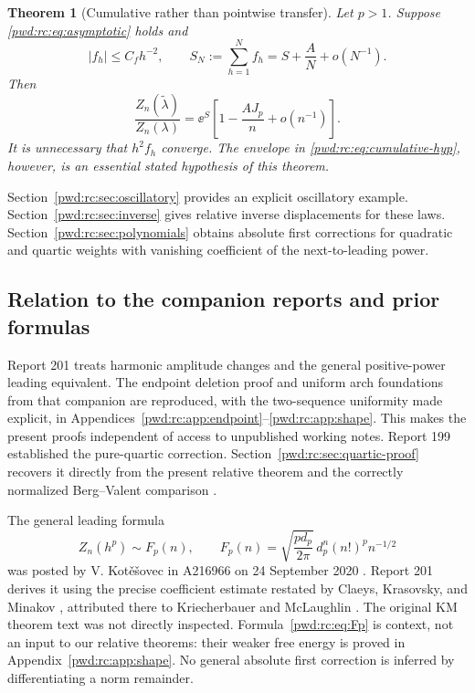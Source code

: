 \documentclass[11pt,letterpaper]{article}
\numberwithin{equation}{section}
\newtheorem{theorem}{Theorem}[section]
\theoremstyle{remark}\newtheorem{remark}[theorem]{Remark}
\begin{document}
\begin{theorem}[Cumulative rather than pointwise transfer]\label{pwd:rc:thm:cumulative}
Let $p>1$. Suppose \eqref{pwd:rc:eq:asymptotic} holds and
\begin{equation}\label{pwd:rc:eq:cumulative-hyp}
 |f_h|\le C_fh^{-2},\qquad
 S_N:=\sum_{h=1}^Nf_h=S+\frac A N+o(N^{-1}).
\end{equation}
Then
\begin{equation}\label{pwd:rc:eq:cumulative}
 \frac{Z_n(\widetilde\lambda)}{Z_n(\lambda)}
 =\ee^S\left[1-\frac{A J_p}{n}+o(n^{-1})\right].
\end{equation}
It is unnecessary that $h^2f_h$ converge. The envelope in \eqref{pwd:rc:eq:cumulative-hyp}, however, is an essential stated hypothesis of this theorem.
\end{theorem}
Section~\ref{pwd:rc:sec:oscillatory} provides an explicit oscillatory example. Section~\ref{pwd:rc:sec:inverse} gives relative inverse displacements for these laws. Section~\ref{pwd:rc:sec:polynomials} obtains absolute first corrections for quadratic and quartic weights with vanishing coefficient of the next-to-leading power.

\subsection{Relation to the companion reports and prior formulas}
Report 201 treats harmonic amplitude changes and the general positive-power leading equivalent. The endpoint deletion proof and uniform arch foundations from that companion are reproduced, with the two-sequence uniformity made explicit, in Appendices~\ref{pwd:rc:app:endpoint}--\ref{pwd:rc:app:shape}. This makes the present proofs independent of access to unpublished working notes. Report 199 established the pure-quartic correction. Section~\ref{pwd:rc:sec:quartic-proof} recovers it directly from the present relative theorem and the correctly normalized Berg--Valent comparison \cite{bergvalent}.

The general leading formula
\begin{equation}\label{pwd:rc:eq:Fp}
 Z_n(h^p)\sim F_p(n),\qquad
 F_p(n)=\sqrt{\frac{p d_p}{2\pi}}\,d_p^n(n!)^p n^{-1/2}
\end{equation}
was posted by V. Kot\v e\v sovec in A216966 on 24 September 2020 \cite{oeiscubic}. Report 201 derives it using the precise coefficient estimate restated by Claeys, Krasovsky, and Minakov \cite[Eq.~(2.3)]{ckm}, attributed there to Kriecherbauer and McLaughlin \cite{km}. The original KM theorem text was not directly inspected. Formula~\eqref{pwd:rc:eq:Fp} is context, not an input to our relative theorems: their weaker free energy is proved in Appendix~\ref{pwd:rc:app:shape}. No general absolute first correction is inferred by differentiating a norm remainder.
\end{document}
